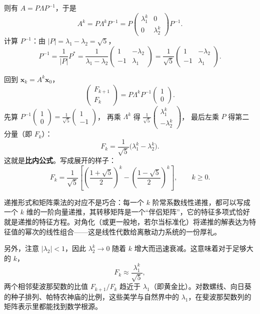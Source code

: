 \documentclass[UTF8]{ctexbook}
\begin{document}
则有 $A=P\Lambda P^{-1}$，于是
\[
A^k=P\Lambda^k P^{-1}=P\begin{pmatrix}\lambda_1^k&0\\0&\lambda_2^k\end{pmatrix}P^{-1}.
\]
计算 $P^{-1}$：由 $|P|=\lambda_1-\lambda_2=\sqrt{5}$，
\[
P^{-1}=\frac{1}{|P|}P^*=\frac{1}{\lambda_1-\lambda_2}\begin{pmatrix}1&-\lambda_2\\-1&\lambda_1\end{pmatrix}
=\frac{1}{\sqrt{5}}\begin{pmatrix}1&-\lambda_2\\-1&\lambda_1\end{pmatrix}.
\]



回到 $\mathbf{x}_k=A^k\mathbf{x}_0$，
\[
\begin{pmatrix}F_{k+1}\\F_k\end{pmatrix}
=P\Lambda^k P^{-1}\begin{pmatrix}1\\0\end{pmatrix}.
\]
先算 $P^{-1}\begin{pmatrix}1\\0\end{pmatrix}=\frac{1}{\sqrt{5}}\begin{pmatrix}1\\-1\end{pmatrix}$，
再乘 $\Lambda^k$ 得 $\frac{1}{\sqrt{5}}\begin{pmatrix}\lambda_1^k\\-\lambda_2^k\end{pmatrix}$，
最后左乘 $P$ 得第二分量（即 $F_k$）：
\[
F_k=\frac{1}{\sqrt{5}}\bigl(\lambda_1^k-\lambda_2^k\bigr).
\]
这就是\textbf{比内公式}。写成展开的样子：
\[
F_k=\frac{1}{\sqrt{5}}\left[\left(\frac{1+\sqrt{5}}{2}\right)^k-\left(\frac{1-\sqrt{5}}{2}\right)^k\right],
\qquad k\geq0.
\]



递推形式和矩阵乘法的对应不是巧合：每一个 $k$ 阶常系数线性递推，都可以写成一个 $k$ 维的一阶向量递推，其转移矩阵是一个“伴侣矩阵”，它的特征多项式恰好就是递推的特征方程。对角化（或更一般地，若尔当标准化）将递推的解表达为特征值的幂次的线性组合——这是线性代数给离散动力系统的一份厚礼。

另外，注意 $|\lambda_2|<1$，因此 $\lambda_2^k\to0$ 随着 $k$ 增大而迅速衰减。这意味着对于足够大的 $k$，
\[
F_k\approx\frac{\lambda_1^k}{\sqrt{5}},
\]
两个相邻斐波那契数的比值 $F_{k+1}/F_k$ 趋近于 $\lambda_1$（即黄金比）。对数螺线、向日葵的种子排列、帕特农神庙的比例，这些美学与自然界中的 $\lambda_1$，在斐波那契数列的矩阵表示里都能找到数学根源。
\end{document}

